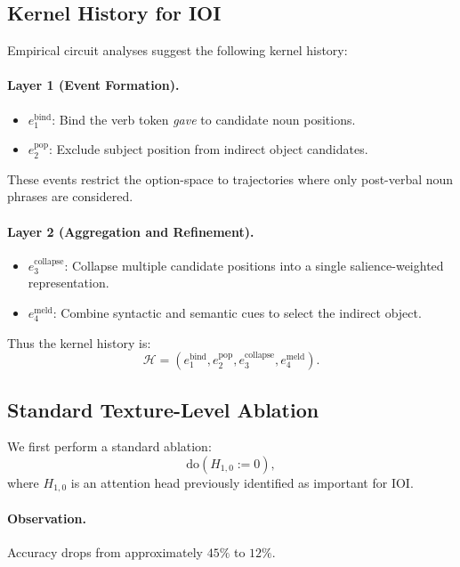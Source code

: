 \documentclass[11pt]{article}
\theoremstyle{remark}
\newcommand{\Hist}{\mathcal{H}}
\newcommand{\Do}{\mathrm{do}}
\begin{document}
\subsection{Kernel History for IOI}

Empirical circuit analyses suggest the following kernel history:

\paragraph{Layer 1 (Event Formation).}
\begin{itemize}
\item $e_1^{\text{bind}}$: Bind the verb token \emph{gave} to candidate
noun positions.
\item $e_2^{\text{pop}}$: Exclude subject position from indirect object
candidates.
\end{itemize}

These events restrict the option-space to trajectories where only
post-verbal noun phrases are considered.

\paragraph{Layer 2 (Aggregation and Refinement).}
\begin{itemize}
\item $e_3^{\text{collapse}}$: Collapse multiple candidate positions
into a single salience-weighted representation.
\item $e_4^{\text{meld}}$: Combine syntactic and semantic cues to select
the indirect object.
\end{itemize}

Thus the kernel history is:
\[
\Hist = (e_1^{\text{bind}}, e_2^{\text{pop}}, e_3^{\text{collapse}},
e_4^{\text{meld}}).
\]

\subsection{Standard Texture-Level Ablation}

We first perform a standard ablation:
\[
\Do(H_{1,0} := 0),
\]
where $H_{1,0}$ is an attention head previously identified as important
for IOI.

\paragraph{Observation.}
Accuracy drops from approximately $45\%$ to $12\%$.
\end{document}
